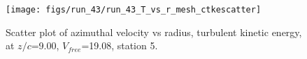\begin{figure}[H]
\centering
\texttt{[image: figs/run\_43/run\_43\_T\_vs\_r\_mesh\_ctkescatter]}
\caption{Scatter plot of azimuthal velocity vs radius, turbulent kinetic energy, at $z/c$=9.00, $V_{free}$=19.08, station 5.}
\label{fig:run_43_T_vs_r_mesh_ctkescatter}
\end{figure}


